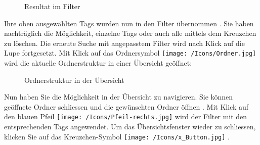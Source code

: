 \begin{figure}[H]
\caption{Resultat im Filter}
\end{figure}

Ihre oben ausgewählten Tags wurden nun in den Filter übernommen . Sie haben nachträglich die Möglichkeit, einzelne Tags oder auch alle mittels dem Kreuzchen zu löschen. Die erneute Suche mit angepasstem Filter wird nach Klick auf die Lupe  fortgesetzt. Mit Klick auf das Ordnersymbol \texttt{[image: /Icons/Ordner.jpg]}  wird die aktuelle Ordnerstruktur in einer Übersicht geöffnet: 

\begin{figure}[H]
\caption{Ordnerstruktur in der Übersicht}
\end{figure}

Nun haben Sie die Möglichkeit in der Übersicht zu navigieren. Sie können geöffnete Ordner  schliessen und die gewünschten Ordner öffnen . Mit Klick auf den blauen Pfeil \texttt{[image: /Icons/Pfeil-rechts.jpg]}  wird der Filter mit den entsprechenden Tags angewendet. Um das Übersichtsfenster wieder zu schliessen, klicken Sie auf das Kreuzchen-Symbol \texttt{[image: /Icons/x\_Button.jpg]} .


